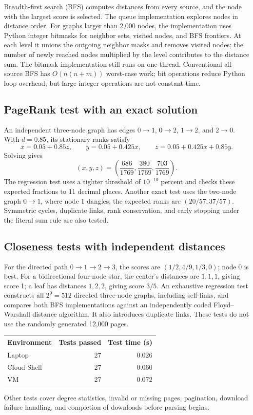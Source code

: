 \documentclass[10pt,letterpaper]{article}
\begin{document}
Breadth-first search (BFS) computes distances from every source, and the node
with the largest score is selected. The queue implementation explores nodes
in distance order. For graphs larger than 2,000 nodes, the implementation uses
Python integer bitmasks for neighbor sets, visited nodes, and BFS frontiers.
At each level it unions the outgoing neighbor masks and removes visited nodes;
the number of newly reached nodes multiplied by the level contributes to the
distance sum. The bitmask implementation still runs on one thread. Conventional
all-source BFS has \(O(n(n+m))\) worst-case work; bit operations reduce Python
loop overhead, but large integer operations are not constant-time.

\subsection{PageRank test with an exact solution}
An independent three-node graph has edges
\(0\to1\), \(0\to2\), \(1\to2\), and \(2\to0\). With \(d=0.85\), its stationary
ranks satisfy
\[
x=0.05+0.85z,\qquad y=0.05+0.425x,\qquad
z=0.05+0.425x+0.85y.
\]
Solving gives
\[
(x,y,z)=\left(\frac{686}{1769},\frac{380}{1769},\frac{703}{1769}\right).
\]
The regression test uses a tighter threshold of \(10^{-10}\) percent and checks
these expected fractions to 11 decimal places. Another exact test uses the
two-node graph \(0\to1\), where node 1 dangles; the expected ranks are
\((20/57,37/57)\). Symmetric cycles, duplicate links, rank conservation, and
early stopping under the literal sum rule are also tested.

\subsection{Closeness tests with independent distances}
For the directed path \(0\to1\to2\to3\), the scores are
\((1/2,4/9,1/3,0)\); node 0 is best. For a bidirectional four-node star,
the center's distances are \(1,1,1\), giving score 1; a leaf has distances
\(1,2,2\), giving score \(3/5\).
An exhaustive regression test constructs all \(2^9=512\) directed three-node
graphs, including self-links, and compares both BFS implementations against
an independently coded Floyd--Warshall distance algorithm. It also introduces
duplicate links. These tests do not use the randomly generated 12,000 pages.

\begin{tabularx}{\linewidth}{@{}Yrr@{}}
\toprule Environment & Tests passed & Test time (s) \\ \midrule
Laptop & 27 & 0.026 \\
Cloud Shell & 27 & 0.060 \\
VM & 27 & 0.072 \\ \bottomrule
\end{tabularx}
Other tests cover degree statistics, invalid or missing pages, pagination,
download failure handling, and completion of downloads before parsing begins.
\end{document}
